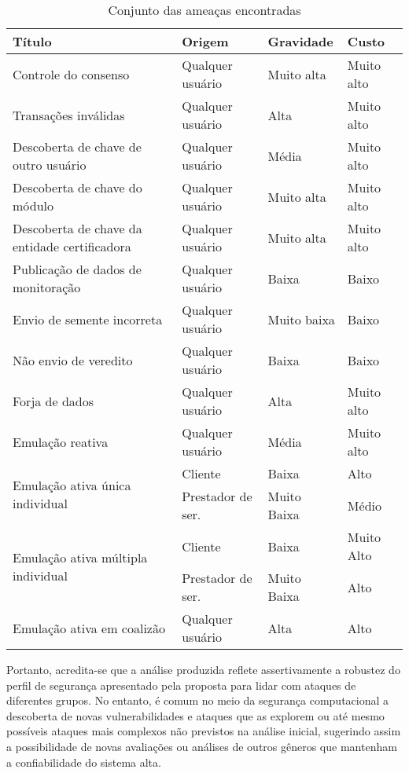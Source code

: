 \begin{table}[ht]
    \centering
    \begin{tabular}{|m{}|m{}|m{}|m{}|}
    \hline
         \textbf{Título} & \textbf{Origem} & \textbf{Gravidade} & \textbf{Custo} \\
         \hline
         Controle do consenso & Qualquer usuário & Muito alta & Muito alto \\
         \hline
         Transações inválidas & Qualquer usuário & Alta & Muito alto \\
         \hline
         Descoberta de chave de outro usuário & Qualquer usuário & Média & Muito alto \\
         \hline
         Descoberta de chave do módulo & Qualquer usuário & Muito alta & Muito alto \\
         \hline
         Descoberta de chave da entidade certificadora & Qualquer usuário & Muito alta & Muito alto \\
        \hline
         Publicação de dados de monitoração & Qualquer usuário & Baixa & Baixo \\
         \hline
         Envio de semente incorreta & Qualquer usuário & Muito baixa & Baixo \\
         \hline
         Não envio de veredito & Qualquer usuário & Baixa & Baixo \\
         \hline
         Forja de dados & Qualquer usuário & Alta & Muito alto \\
         \hline
         Emulação reativa & Qualquer usuário & Média & Muito alto \\
         \hline
         \multirow{2}{0.25\textwidth}{Emulação ativa única individual} & Cliente & Baixa & Alto \\
         \cline{2-4}
         & Prestador de ser. & Muito Baixa & Médio \\
         \hline
         \multirow{2}{0.25\textwidth}{Emulação ativa múltipla individual} & Cliente & Baixa & Muito Alto \\
         \cline{2-4}
         & Prestador de ser. & Muito Baixa & Alto \\
         \hline
         Emulação ativa em coalizão & Qualquer usuário & Alta & Alto \\
    \hline
    \end{tabular}
    \caption{Conjunto das ameaças encontradas}
    \label{tab:ameacas}
\end{table}



%
Portanto, acredita-se que a análise produzida reflete assertivamente a robustez do perfil de segurança apresentado pela proposta para lidar com ataques de diferentes grupos. No entanto, é comum no meio da segurança computacional a descoberta de novas vulnerabilidades e ataques que as explorem ou até mesmo possíveis ataques mais complexos não previstos na análise inicial, sugerindo assim a possibilidade de novas avaliações ou análises de outros gêneros que mantenham a confiabilidade do sistema alta.